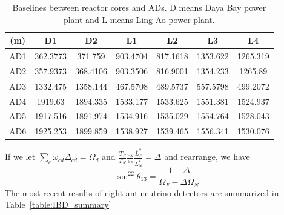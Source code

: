 \begin{table}
	\centering
	\begin{tabular}{|c|c|c|c|c|c|c|}
		\hline
		(m) & D1 & D2 & L1 & L2 & L3 & L4 \\
		\hline
		AD1 & 362.3773 & 371.759 & 903.4704 & 817.1618 & 1353.622 & 1265.319 \\
		AD2 & 357.9373 & 368.4106 & 903.3506 & 816.9001 & 1354.233 & 1265.89 \\
		AD3 & 1332.475 & 1358.144 & 467.5708 & 489.5737 & 557.5798 & 499.2072 \\
		AD4 & 1919.63 & 1894.335 & 1533.177 & 1533.625 & 1551.381 & 1524.937 \\
		AD5 & 1917.516 & 1891.974 & 1534.916 & 1535.029 & 1554.764 & 1528.043 \\
		AD6 & 1925.253 & 1899.859 & 1538.927 & 1539.465 & 1556.341 & 1530.076 \\
		\hline
	\end{tabular}
	\caption{Baselines between reactor cores and ADs. D means Daya Bay power plant and L means Ling Ao power plant.}
	\label{table:baseline}
\end{table}
If we let $\sum\limits_c\omega_{cd}\Delta_{cd}=\Omega_d$ and $\frac{T_F}{T_N}\frac{\epsilon_N}{\epsilon_F}\frac{\bar{L}^2_F}{\bar{L}^2_N}=\Delta$ and rearrange, we have
\begin{equation}\label{eq:theta13_relative}
	\sin^22\theta_{13}=\frac{1-\Delta}{\Omega_F-\Delta\Omega_N}
\end{equation}
The most recent results of eight antineutrino detectors are summarized in Table~\ref{table:IBD_summary}
